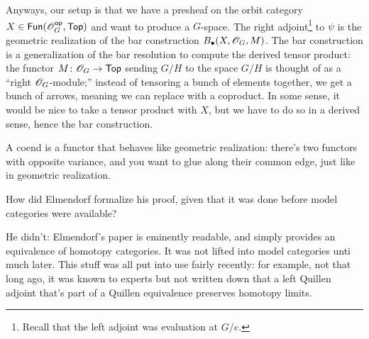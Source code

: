 Anyways, our setup is that we have a presheaf on the orbit category $X\in\mathsf{Fun}(\mathscr O_G^{\mathsf{op}},\mathsf{Top})$ and want to produce a
$G$-space. The right adjoint\footnote{Recall that the left adjoint was evaluation at $G/e$.} to $\psi$ is the
geometric realization of the bar construction $B_\bullet(X,\mathscr O_G,M)$. The bar construction is a generalization of
the bar resolution to compute the derived tensor product: the functor $M\colon \mathscr O_G\to\mathsf{Top}$ sending $G/H$ to the
space $G/H$ is thought of as a ``right $\mathscr O_G$-module;'' instead of tensoring a bunch of elements together, we get
a bunch of arrows, meaning we can replace with a coproduct. In some sense, it would be nice to take a tensor
product with $X$, but we have to do so in a derived sense, hence the bar construction.

A coend is a functor that behaves like geometric realization: there's two functors with opposite variance, and you
want to glue along their common edge, just like in geometric realization.
\begin{ques}
How did Elmendorf formalize his proof, given that it was done before model categories were available?
\end{ques}
He didn't: Elmendorf's paper is eminently readable, and simply provides an equivalence of homotopy categories. It
was not lifted into model categories unti much later. This stuff was all put into use fairly recently: for example,
not that long ago, it was known to experts but not written down that a left Quillen adjoint that's part of a
Quillen equivalence preserves homotopy limits.

